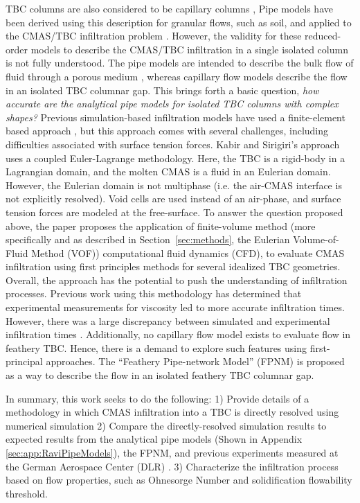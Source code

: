 \documentclass[%
 aip,
 amsmath,amssymb,
 reprint,%
]{revtex4-1}
\begin{document}
TBC columns are also considered to be capillary columns \cite{Naraparaju2017}, Pipe models have been derived using this description for granular flows, such as soil, and applied to the CMAS/TBC infiltration problem \cite{CARMAN1997S32, Chapuis2003616, Naraparaju2019}. However, the validity for these reduced-order models to describe the CMAS/TBC infiltration in a single isolated column is not fully understood. The pipe models are intended to describe the bulk flow of fluid through a porous medium \cite{Naraparaju2017}, whereas capillary flow models describe the flow in an isolated TBC columnar gap. This brings forth a basic question, \textit{how accurate are the analytical pipe models for isolated TBC columns with complex shapes?}
Previous simulation-based infiltration models have used a finite-element based approach \cite{Kabir, Sirigiri2018}, but this approach comes with several challenges, including difficulties associated with surface tension forces. Kabir and Sirigiri's approach uses a coupled Euler-Lagrange methodology. Here, the TBC is a rigid-body in a Lagrangian domain, and the molten CMAS is a fluid in an Eulerian domain. However, the Eulerian domain is not multiphase (i.e. the air-CMAS interface is not explicitly resolved). Void cells are used instead of an air-phase, and surface tension forces are modeled at the free-surface.
To answer the question proposed above, the paper proposes the application of finite-volume method (more specifically and as described in Section~\ref{sec:methods}, the Eulerian Volume-of-Fluid Method (VOF)) computational fluid dynamics (CFD), to evaluate CMAS infiltration using first principles methods for several idealized TBC geometries. 
Overall, the approach has the potential to push the understanding of infiltration processes. Previous work using this methodology has determined that experimental measurements for viscosity led to more accurate infiltration times. However, there was a large discrepancy between simulated and experimental infiltration times \cite{Cavainolo2023}. 
Additionally, no capillary flow model exists to evaluate flow in feathery TBC. Hence, there is a demand to explore such features using first-principal approaches. The ``Feathery Pipe-network Model'' (FPNM) is proposed as a way to describe the flow in an isolated feathery TBC columnar gap. 

In summary, this work seeks to do the following: 1) Provide details of a methodology in which CMAS infiltration into a TBC is directly resolved using numerical simulation 2) Compare the directly-resolved simulation results to expected results from the analytical pipe models \cite{Naraparaju2019} (Shown in Appendix \ref{sec:app:RaviPipeModels}), the FPNM, and previous experiments measured at the German Aerospace Center (DLR) \cite{Naraparaju2019}. 3) Characterize the infiltration process based on flow properties, such as Ohnesorge Number and solidification flowability threshold.
\end{document}
